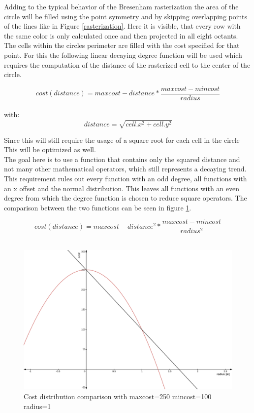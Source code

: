 Adding to the typical behavior of the Bresenham rasterization the area of the circle will be filled using the point symmetry and by skipping overlapping points of the lines like in Figure \ref{rasterization}. Here it is visible, that every row with the same color is only calculated once and then projected in all eight octants. 
The cells within the circles perimeter are filled with the cost specified for that point. For this the following linear decaying  degree function will be used which requires the computation of the distance of the rasterized cell to the center of the circle.

\[cost(distance)=maxcost-distance*\frac{maxcost-mincost}{radius}\]\\
with: \[distance=\sqrt{cell.x^2+cell.y^2}\]

 Since this will still require the usage of a square root for each cell in the circle This will be optimized as well.\\

The goal here is to use a function that contains only the squared distance and not many other mathematical operators, which still represents a decaying trend. This requirement rules out every function with an odd degree, all functions with an x offset and the normal distribution. This leaves all functions with an even degree from which the  degree function is chosen to reduce square operators. The comparison between the two functions can be seen in figure \ref{distrcomp}.

\[cost(distance)=maxcost-distance^2*\frac{maxcost-mincost}{radius^2}\]\\

\begin{figure} 
	\centering
	\includegraphics[width=140mm]{Pictures/linear cost comparison}
	\caption{Cost distribution comparison with maxcost=250 mincost=100 radius=1}
	\label{distrcomp}
\end{figure}

